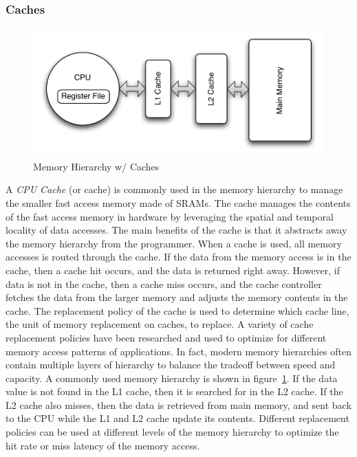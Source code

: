 \subsubsection{Caches}
\begin{figure}
  \vspace{-20pt}
  \begin{center}
    \includegraphics[scale=.5]{figs/conventional_mem_hierarchy}
  \end{center}
  \vspace{-20pt}
  \caption{Memory Hierarchy w/ Caches}
  \label{fig:conventional_mem_hierarchy}
  \vspace{-10pt}
\end{figure}   
A \emph{CPU Cache} (or cache) is commonly used in the memory hierarchy to manage the smaller fast access memory made of SRAMs.
The cache manages the contents of the fast access memory in hardware by leveraging the spatial and temporal locality of data accesses. 
The main benefits of the cache is that it abstracts away the memory hierarchy from the programmer.
When a cache is used, all memory accesses is routed through the cache. 
If the data from the memory access is in the cache, then a cache hit occurs, and the data is returned right away.
However, if data is not in the cache, then a cache miss occurs, and the cache controller fetches the data from the larger memory and adjusts the memory contents in the cache. 
The replacement policy of the cache is used to determine which cache line, the unit of memory replacement on caches, to replace. 
A variety of cache replacement policies have been researched and used to optimize for different memory access patterns of applications. 
In fact, modern memory hierarchies often contain multiple layers of hierarchy to balance the tradeoff between speed and capacity.
A commonly used memory hierarchy is shown in figure~\ref{fig:conventional_mem_hierarchy}.
If the data value is not found in the L1 cache, then it is searched for in the L2 cache. 
If the L2 cache also misses, then the data is retrieved from main memory, and sent back to the CPU while the L1 and L2 cache update its contents.
Different replacement policies can be used at different levels of the memory hierarchy to optimize the hit rate or miss latency of the memory access.

